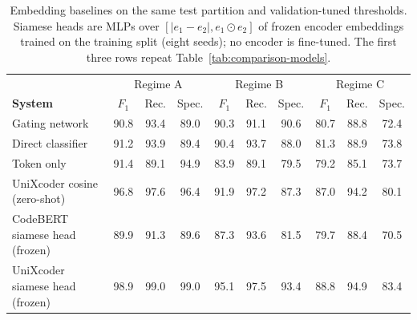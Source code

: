 \begin{table}[t]
\centering
\caption{Embedding baselines on the same test partition and validation-tuned thresholds. Siamese heads are MLPs over $[|e_1-e_2|, e_1\odot e_2]$ of frozen encoder embeddings trained on the training split (eight seeds); no encoder is fine-tuned. The first three rows repeat Table~\ref{tab:comparison-models}.}
\label{tab:embedding-baselines}
\footnotesize
\setlength{\tabcolsep}{3pt}
\begin{tabular}{l|ccc|ccc|ccc}
\toprule
 & \multicolumn{3}{c|}{Regime A} & \multicolumn{3}{c|}{Regime B} & \multicolumn{3}{c}{Regime C} \\
\textbf{System} & $F_1$ & Rec. & Spec. & $F_1$ & Rec. & Spec. & $F_1$ & Rec. & Spec. \\
\midrule
Gating network & 90.8 & 93.4 & 89.0 & 90.3 & 91.1 & 90.6 & 80.7 & 88.8 & 72.4 \\
Direct classifier & 91.2 & 93.9 & 89.4 & 90.4 & 93.7 & 88.0 & 81.3 & 88.9 & 73.8 \\
Token only & 91.4 & 89.1 & 94.9 & 83.9 & 89.1 & 79.5 & 79.2 & 85.1 & 73.7 \\
UniXcoder cosine (zero-shot) & 96.8 & 97.6 & 96.4 & 91.9 & 97.2 & 87.3 & 87.0 & 94.2 & 80.1 \\
CodeBERT siamese head (frozen) & 89.9 & 91.3 & 89.6 & 87.3 & 93.6 & 81.5 & 79.7 & 88.4 & 70.5 \\
UniXcoder siamese head (frozen) & 98.9 & 99.0 & 99.0 & 95.1 & 97.5 & 93.4 & 88.8 & 94.9 & 83.4 \\
\bottomrule
\end{tabular}
\end{table}